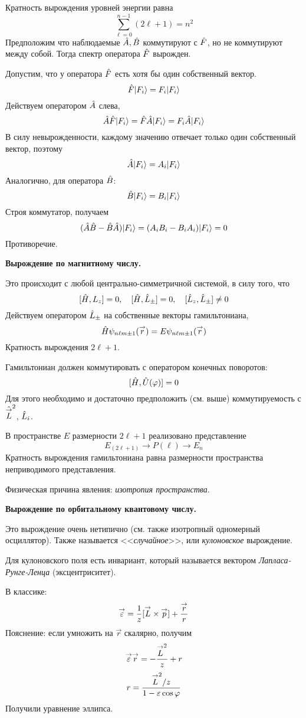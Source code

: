 Кратность вырождения уровней энергии равна
$$
    \sum_{\ell=0}^{n-1} (2\ell + 1) = n^2
$$
\Th Предположим что наблюдаемые $\Hat A, \Hat B$ коммутируют с $\Hat F$, но не коммутируют между собой. Тогда спектр оператора $\Hat F$ вырожден.

\Proof Допустим, что у оператора $\Hat F$ есть хотя бы один собственный вектор.
$$
    \Hat F \qu{F_i} = F_i \qu{F_i}
$$
Действуем оператором $\Hat A$ слева, 
$$
    \Hat A \Hat F \qu{F_i} = \hat F \hat A \qu{F_i} = F_i \Hat A\qu{F_i}
$$
В силу невырожденности, каждому значению отвечает только один собственный вектор, поэтому
$$
    \Hat A \qu{F_i} = A_i \qu{F_i}
$$
Аналогично, для оператора $\Hat B$:
$$
    \Hat B \qu{F_i} = B_i \qu{F_i}
$$
Строя коммутатор, получаем
$$
    (\Hat A \Hat B - \Hat B \Hat A) \qu{F_i} = (A_i B_i - B_i A_i) \qu{F_i} = 0
$$
Противоречие.

\textbf{Вырождение по магнитному числу.}

Это происходит с любой центрально-симметричной системой, в силу того, что
$$
    [\Hat H, L_z] = 0, \quad [\Hat H, \Hat L_\pm] = 0, \quad [\Hat L_z, \Hat L_{\pm}] \neq 0
$$
Действуем оператором $\Hat L_{\pm}$ на собственные векторы гамильтониана,
$$
    \Hat H \psi_{n \ell m \pm 1} (\vec r) = E \psi_{n \ell m\pm1} (\vec r)
$$
Кратность вырождения $2 \ell +1$.

Гамильтониан должен коммутировать с оператором конечных поворотов:
$$
    [\Hat H, \Hat U(\phi)] = 0
$$
Для этого необходимо и достаточно предположить (см. выше) коммутируемость с $\Hat{\vec L}^2$, $\Hat L_i$.

В пространстве $E$ размерности $2 \ell + 1$ реализовано представление
$$
    E_{(2\ell+1)} \to P(\ell) \to E_n
$$
Кратность вырождения гамильтониана равна размерности пространства неприводимого представления.

Физическая причина явления: \emph{изотропия пространства}.

\textbf{Вырождение по орбитальному квантовому числу.}

Это вырождение очень нетипично (см. также изотропный одномерный осциллятор). Также называется <<\emph{случайное}>>, или \emph{кулоновское} вырождение. 

Для кулоновского поля есть инвариант, который называется вектором \emph{Лапласа-Рунге-Ленца} (эксцентриситет).

В классике:
$$
    \vec \eps = \dfrac{1}{z} [\vec L \times \vec p] + \dfrac{\vec r}{r}
$$
Пояснение: если умножить на $\vec r$ скалярно, получим
$$
    \vec{\eps} \vec{r} = - \dfrac{\vec L^2}{z} + r
$$
$$
    r = \dfrac{\vec L^2 / z}{1 - \eps \cos \phi}
$$
Получили уравнение эллипса.

